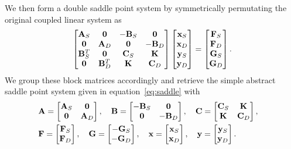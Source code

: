 We then form a double saddle point system by symmetrically permutating the 
original coupled linear system as
\begin{equation}
\begin{bmatrix}
\bold{A}_S   & \bold{0}     & -\bold{B}_S &  \bold{0}   \\
\bold{0}     & \bold{A}_D   &  \bold{0}   & -\bold{B}_D \\
\bold{B}_S^T & \bold{0}     &  \bold{C}_S &  \bold{K}   \\
\bold{0}     & \bold{B}_D^T &  \bold{K}   &  \bold{C}_D
\end{bmatrix} \begin{bmatrix}
\bold{x}_S\\
\bold{x}_D\\
\bold{y}_S\\
\bold{y}_D
\end{bmatrix}= 
\begin{bmatrix}
\bold{F}_S\\
\bold{F}_D\\
\bold{G}_S\\
\bold{G}_D
\end{bmatrix}.
\end{equation}
We group these block matrices accordingly and 
retrieve the simple abstract saddle point
system given in equation~\eqref{eq:saddle} with
\begin{equation}
		  \begin{aligned}
					 &\bold{A} = \begin{bmatrix}
\bold{A}_S   & \bold{0}    \\
\bold{0}     & \bold{A}_D  
\end{bmatrix},
\quad
\bold{B} = \begin{bmatrix}
-\bold{B}_S & \bold{0}   \\
\bold{0}   & -\bold{B}_D
\end{bmatrix},
\quad
\bold{C} = \begin{bmatrix}
\bold{C}_S &  \bold{K}   \\
\bold{K}   &  \bold{C}_D
\end{bmatrix},
\quad \\
					 &\bold{F} = \begin{bmatrix}
\bold{F}_S \\
\bold{F}_D
\end{bmatrix},
\quad
\bold{G} = \begin{bmatrix}
-\bold{G}_S \\
-\bold{G}_D
\end{bmatrix},
\quad
					 \bold{x} = \begin{bmatrix}
\bold{x}_S \\
\bold{x}_D
\end{bmatrix},
\quad
\bold{y} = \begin{bmatrix}
\bold{y}_S \\
\bold{y}_D
\end{bmatrix}.
\end{aligned}
\end{equation}

